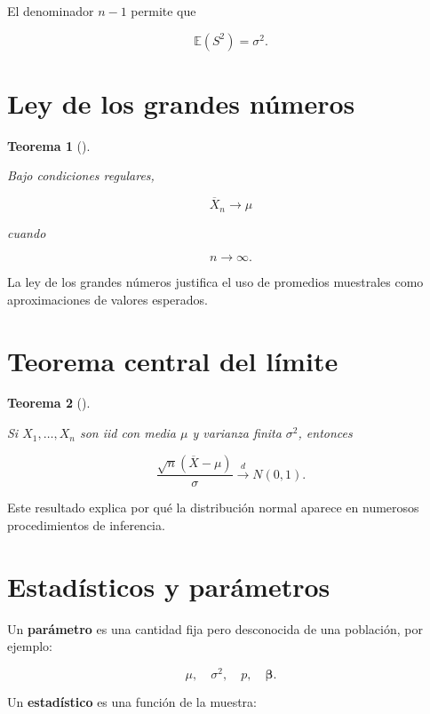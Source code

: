 \documentclass[
  spanish,
  11pt,
  letterpaper,
  DIV=11,
  numbers=noendperiod]{scrreprt}
\theoremstyle{definition}
\theoremstyle{plain}
\newtheorem{theorem}{Teorema}[chapter]
\theoremstyle{definition}
\theoremstyle{remark}
\begin{document}
El denominador \(n-1\) permite que

\[
\mathbb{E}(S^2)=\sigma^2.
\]

\section{Ley de los grandes
números}\label{ley-de-los-grandes-nuxfameros}

\begin{theorem}[]\protect\hypertarget{thm-ley-grandes-numeros}{}\label{thm-ley-grandes-numeros}

Bajo condiciones regulares,

\[
\overline{X}_n
\longrightarrow
\mu
\]

cuando

\[
n\to\infty.
\]

\end{theorem}

La ley de los grandes números justifica el uso de promedios muestrales
como aproximaciones de valores esperados.

\section{Teorema central del
límite}\label{teorema-central-del-luxedmite}

\begin{theorem}[]\protect\hypertarget{thm-teorema-central-limite}{}\label{thm-teorema-central-limite}

Si \(X_1,\ldots,X_n\) son iid con media \(\mu\) y varianza finita
\(\sigma^2\), entonces

\[
\frac{
\sqrt{n}
(\overline{X}-\mu)
}{
\sigma
}
\overset{d}{\longrightarrow}
N(0,1).
\]

\end{theorem}

Este resultado explica por qué la distribución normal aparece en
numerosos procedimientos de inferencia.

\section{Estadísticos y
parámetros}\label{estaduxedsticos-y-paruxe1metros}

Un \textbf{parámetro} es una cantidad fija pero desconocida de una
población, por ejemplo:

\[
\mu,\quad \sigma^2,\quad p,\quad \boldsymbol{\beta}.
\]

Un \textbf{estadístico} es una función de la muestra:
\end{document}
